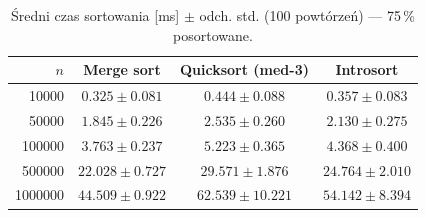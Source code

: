 \begin{table}[H]
\centering
\caption{Średni czas sortowania [ms] $\pm$ odch. std. (100 powtórzeń) — 75\,\% posortowane.}
\label{tab:summary_sorted_75}
\begin{tabular}{rccc}
\toprule
$n$ & Merge sort & Quicksort (med-3) & Introsort \\
\midrule
\num{10000} & $0.325 \pm 0.081$ & $0.444 \pm 0.088$ & $0.357 \pm 0.083$ \\
\num{50000} & $1.845 \pm 0.226$ & $2.535 \pm 0.260$ & $2.130 \pm 0.275$ \\
\num{100000} & $3.763 \pm 0.237$ & $5.223 \pm 0.365$ & $4.368 \pm 0.400$ \\
\num{500000} & $22.028 \pm 0.727$ & $29.571 \pm 1.876$ & $24.764 \pm 2.010$ \\
\num{1000000} & $44.509 \pm 0.922$ & $62.539 \pm 10.221$ & $54.142 \pm 8.394$ \\
\bottomrule
\end{tabular}
\end{table}
